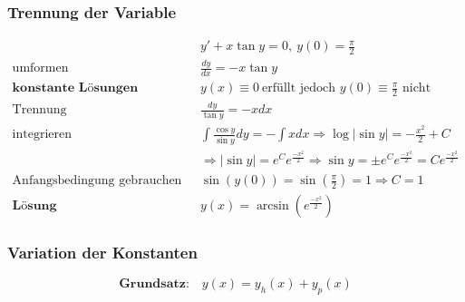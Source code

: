 \documentclass[11pt]{article}
\begin{document}
\subsubsection{Trennung der Variable}

\begin{equation*}
\begin{split}
	& y' + x \tan y = 0,\ y(0) = \frac{\pi}{2} \\
	\text{umformen}\quad & \frac{dy}{dx} = -x \tan y \\
	\textbf{konstante L{\"o}sungen}\quad & y(x) \equiv 0\ \text{erf{\"u}llt jedoch $y(0) \equiv \frac{\pi}{2}$ nicht} \\
	\text{Trennung}\quad & \frac{dy}{\tan y} = -x dx \\
	\text{integrieren}\quad & \int\frac{\cos y}{\sin y}dy = - \int xdx \Rightarrow \log|\sin y| = -\frac{x^2}{2} + C \\
	& \Rightarrow |\sin y| = e^Ce^{\frac{-x^2}{2}} \Rightarrow \sin y = \pm e^Ce^{\frac{-x^2}{2}} = Ce^{\frac{-x^2}{2}} \\
	\text{Anfangsbedingung gebrauchen}\quad & \sin(y(0)) = \sin (\frac{\pi}{2}) = 1 \Rightarrow C = 1 \\
	\textbf{L{\"o}sung}\quad & y(x) = \arcsin (e^{\frac{-x^2}{2}})
\end{split}
\end{equation*}

\subsubsection{Variation der Konstanten}

\begin{equation*}
	\textbf{Grundsatz:}\quad y(x) = y_h(x) + y_p(x)
\end{equation*}
\end{document}
